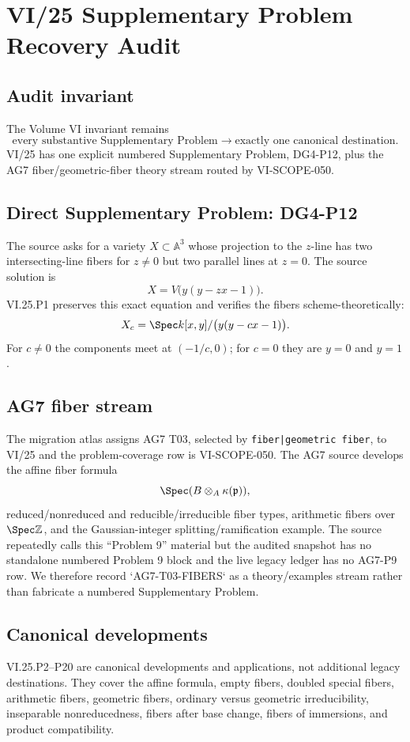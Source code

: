 \chapter*{VI/25 Supplementary Problem Recovery Audit}

\section*{Audit invariant}
The Volume VI invariant remains
\[
\boxed{\text{every substantive Supplementary Problem}\longrightarrow\text{exactly one canonical destination}.}
\]
VI/25 has one explicit numbered Supplementary Problem, DG4-P12, plus the AG7 fiber/geometric-fiber theory
stream routed by VI-SCOPE-050.

\section*{Direct Supplementary Problem: DG4-P12}
The source asks for a variety $X\subset\mathbb A^3$ whose projection to the $z$-line has two
intersecting-line fibers for $z\ne0$ but two parallel lines at $z=0$.  The source solution is
\[
X=V\bigl(y(y-zx-1)\bigr).
\]
VI.25.P1 preserves this exact equation and verifies the fibers scheme-theoretically:
\[
X_c=\Spec k[x,y]/\bigl(y(y-cx-1)\bigr).
\]
For $c\ne0$ the components meet at $(-1/c,0)$; for $c=0$ they are $y=0$ and $y=1$.

\section*{AG7 fiber stream}
The migration atlas assigns AG7 T03, selected by \texttt{fiber|geometric fiber}, to VI/25 and the
problem-coverage row is VI-SCOPE-050.  The AG7 source develops the affine fiber formula
\[
\Spec(B\otimes_A\kappa(\mathfrak p)),
\]
reduced/nonreduced and reducible/irreducible fiber types, arithmetic fibers over $\Spec\mathbb Z$,
and the Gaussian-integer splitting/ramification example.  The source repeatedly calls this “Problem
9” material but the audited snapshot has no standalone numbered Problem 9 block and the live legacy
ledger has no AG7-P9 row.  We therefore record `AG7-T03-FIBERS` as a theory/examples stream rather
than fabricate a numbered Supplementary Problem.

\section*{Canonical developments}
VI.25.P2--P20 are canonical developments and applications, not additional legacy destinations.  They
cover the affine formula, empty fibers, doubled special fibers, arithmetic fibers, geometric fibers,
ordinary versus geometric irreducibility, inseparable nonreducedness, fibers after base change,
fibers of immersions, and product compatibility.

